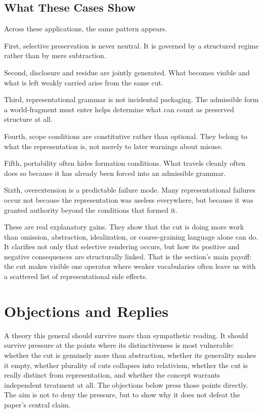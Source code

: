 \documentclass[11pt]{article}
\begin{document}
\subsection{What These Cases Show}

Across these applications, the same pattern appears.

First, selective preservation is never neutral. It is governed by a structured regime rather than by mere subtraction.

Second, disclosure and residue are jointly generated. What becomes visible and what is left weakly carried arise from the same cut.

Third, representational grammar is not incidental packaging. The admissible form a world-fragment must enter helps determine what can count as preserved structure at all.

Fourth, scope conditions are constitutive rather than optional. They belong to what the representation is, not merely to later warnings about misuse.

Fifth, portability often hides formation conditions. What travels cleanly often does so because it has already been forced into an admissible grammar.

Sixth, overextension is a predictable failure mode. Many representational failures occur not because the representation was useless everywhere, but because it was granted authority beyond the conditions that formed it.

These are real explanatory gains. They show that the cut is doing more work than omission, abstraction, idealization, or coarse-graining language alone can do. It clarifies not only that selective rendering occurs, but how its positive and negative consequences are structurally linked. That is the section's main payoff: the cut makes visible one operator where weaker vocabularies often leave us with a scattered list of representational side effects.
\section{Objections and Replies}

A theory this general should survive more than sympathetic reading. It should survive pressure at the points where its distinctiveness is most vulnerable: whether the cut is genuinely more than abstraction, whether its generality makes it empty, whether plurality of cuts collapses into relativism, whether the cut is really distinct from representation, and whether the concept warrants independent treatment at all. The objections below press those points directly. The aim is not to deny the pressure, but to show why it does not defeat the paper's central claim.
\end{document}
